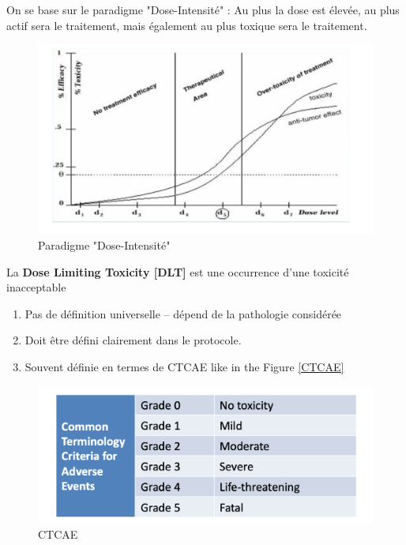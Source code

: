 On se base sur le paradigme "Dose-Intensité" :
Au plus la dose est élevée, au plus actif sera le traitement, mais également au plus toxique sera le traitement.\\

\begin{figure}[H]
    \centering
    \includegraphics[scale=0.3]{images/paradignmedoseintensite.png}
    \caption{Paradigme "Dose-Intensité"}
    \label{fig:dose_intensite}
\end{figure}

La \textbf{Dose Limiting Toxicity [DLT]} est une occurrence d’une toxicité inacceptable
\begin{enumerate}
    \item  Pas de définition universelle – dépend de la pathologie considérée
    \item Doit être défini clairement dans le protocole. 
    \item Souvent définie en termes de CTCAE like in the Figure \ref{CTCAE}
\end{enumerate}

\begin{figure}[H]
    \centering
    \includegraphics[scale =0.5]{images/CTCAE.png}
    \caption{CTCAE}
    \label{fig:CTCAE}
\end{figure}

